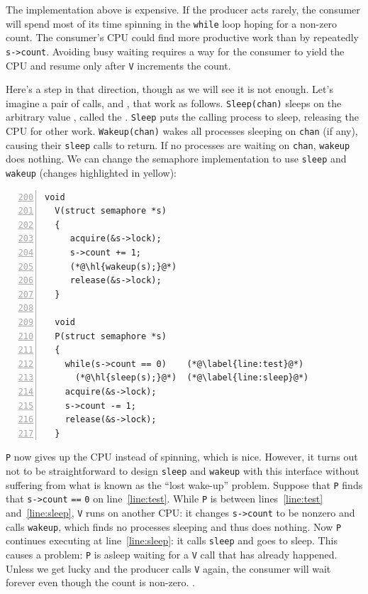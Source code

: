 The implementation above 
is expensive.  If the producer acts
rarely, the consumer will spend most
of its time spinning in the 
\lstinline{while}
loop hoping for a non-zero count.
The consumer's CPU could find more productive work than
by repeatedly 
\lstinline{s->count}.
Avoiding busy waiting requires
a way for the consumer to yield the CPU
and resume only after
\lstinline{V}
increments the count.

Here's a step in that direction, though as we
will see it is not enough.
Let's imagine a pair of calls, 
and
,
that work as follows.
\lstinline{Sleep(chan)}
sleeps on the arbitrary value
,
called the 
.
\lstinline{Sleep}
puts the calling process to sleep, releasing the CPU
for other work.
\lstinline{Wakeup(chan)}
wakes all processes sleeping on
\lstinline{chan}
(if any), causing their
\lstinline{sleep}
calls to return.
If no processes are waiting on
\lstinline{chan},
\lstinline{wakeup}
does nothing.
We can change the semaphore implementation to use
\lstinline{sleep}
and
\lstinline{wakeup} (changes highlighted in yellow):
\begin{lstlisting}[numbers=left,firstnumber=200]
  void
  V(struct semaphore *s)
  {
     acquire(&s->lock);
     s->count += 1;
     (*@\hl{wakeup(s);}@*)
     release(&s->lock);
  }
  
  void
  P(struct semaphore *s)
  {
    while(s->count == 0)    (*@\label{line:test}@*)
      (*@\hl{sleep(s);}@*)  (*@\label{line:sleep}@*)
    acquire(&s->lock);
    s->count -= 1;
    release(&s->lock);
  }
\end{lstlisting}


\lstinline{P}
now gives up the CPU instead of spinning, which is nice.
However, it turns out not to be straightforward to design
\lstinline{sleep}
and 
\lstinline{wakeup}
with this interface without suffering
from what is known as the ``lost wake-up'' problem.
Suppose that
\lstinline{P}
finds that
\lstinline{s->count}
\lstinline{==}
\lstinline{0} 
on line~\ref{line:test}.
While
\lstinline{P}
is between lines~\ref{line:test} and~\ref{line:sleep},
\lstinline{V}
runs on another CPU:
it changes
\lstinline{s->count}
to be nonzero and calls
\lstinline{wakeup},
which finds no processes sleeping and thus does nothing.
Now
\lstinline{P}
continues executing at line~\ref{line:sleep}:
it calls
\lstinline{sleep}
and goes to sleep.
This causes a problem:
\lstinline{P}
is asleep waiting for a \lstinline{V} call
that has already happened.
Unless we get lucky and the producer calls
\lstinline{V} again, the consumer will wait
forever even though the count is non-zero.
.

